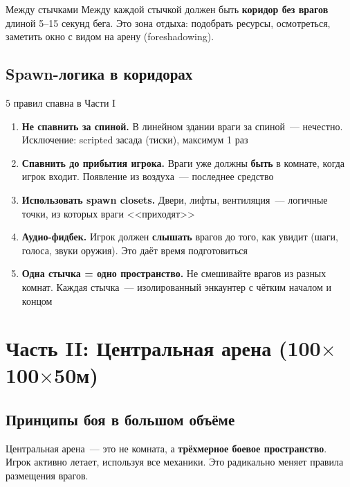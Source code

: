 \documentclass[a4paper,11pt]{report}
\begin{document}
\begin{tip}{Между стычками}
Между каждой стычкой должен быть \textbf{коридор без врагов}
длиной 5--15 секунд бега. Это зона отдыха: подобрать ресурсы,
осмотреться, заметить окно с видом на арену (foreshadowing).
\end{tip}

\section{Spawn-логика в коридорах}

\begin{rulebox}{5 правил спавна в Части I}
\begin{enumerate}[leftmargin=*]
  \item \textbf{Не спавнить за спиной.} В линейном здании враги за
    спиной~--- нечестно. Исключение: scripted засада (тиски),
    максимум 1 раз
  \item \textbf{Спавнить до прибытия игрока.} Враги уже должны \textbf{быть}
    в комнате, когда игрок входит. Появление из воздуха~--- последнее средство
  \item \textbf{Использовать spawn closets.} Двери, лифты, вентиляция~---
    логичные точки, из которых враги <<приходят>>
  \item \textbf{Аудио-фидбек.} Игрок должен \textbf{слышать} врагов до того,
    как увидит (шаги, голоса, звуки оружия). Это даёт время подготовиться
  \item \textbf{Одна стычка = одно пространство.} Не смешивайте врагов
    из разных комнат. Каждая стычка~--- изолированный энкаунтер
    с чётким началом и концом
\end{enumerate}
\end{rulebox}


\chapter{Часть II: Центральная арена (100$\times$100$\times$50м)}

\section{Принципы боя в большом объёме}

Центральная арена~--- это не комната, а \textbf{трёхмерное боевое
пространство}. Игрок активно летает, используя все механики.
Это радикально меняет правила размещения врагов.
\end{document}
